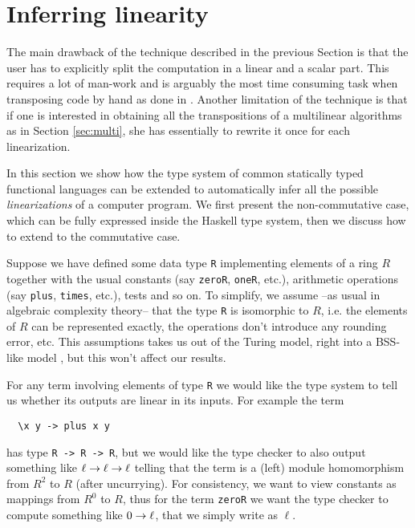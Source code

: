 \section{Inferring linearity}
\label{sec:inference}
\lstset{language=haskell}

The main drawback of the technique described in the previous Section
is that the user has to explicitly split the computation in a linear
and a scalar part. This requires a lot of man-work and is arguably the
most time consuming task when transposing code by hand as done in
\cite{Sho95,BoLeSc03}. Another limitation of the technique is that if
one is interested in obtaining all the transpositions of a multilinear
algorithms as in Section \ref{sec:multi}, she has essentially to
rewrite it once for each linearization.

In this section we show how the type system of common statically typed
functional languages can be extended to automatically infer all the
possible \emph{linearizations} of a computer program. We first present
the non-commutative case, which can be fully expressed inside the
Haskell type system, then we discuss how to extend to the commutative
case.

Suppose we have defined some data type \lstinline{R} implementing
elements of a ring $R$ together with the usual constants (say
\lstinline{zeroR}, \lstinline{oneR}, etc.), arithmetic operations (say
\lstinline{plus}, \lstinline{times}, etc.), tests and so on. To
simplify, we assume --as usual in algebraic complexity theory-- that
the type \lstinline{R} is isomorphic to $R$, i.e. the elements of $R$
can be represented exactly, the operations don't introduce any
rounding error, etc. This assumptions takes us out of the Turing
model, right into a BSS-like model \cite{BSS}, but this won't affect
our results.

For any term involving elements of type \lstinline{R} we would like
the type system to tell us whether its outputs are linear in its
inputs. For example the term
\begin{lstlisting}
  \x y -> plus x y
\end{lstlisting}
has type \lstinline{R -> R -> R}, but we would like the type checker
to also output something like $\ell\rightarrow\ell\rightarrow\ell$ telling that the
term is a (left) module homomorphism from $R^2$ to $R$ (after
uncurrying). For consistency, we want to view constants as mappings
from $R^0$ to $R$, thus for the term \lstinline{zeroR} we want the
type checker to compute something like $0\rightarrow\ell$, that we simply
write as $\ell$.

